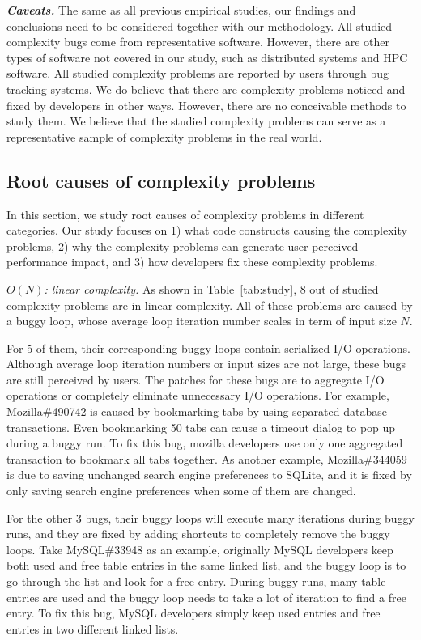 {\bf{\textit{Caveats.}}}
The same as all previous empirical studies, 
our findings and conclusions need to be considered together with our methodology.
All studied complexity bugs come from representative software. 
However, there are other types of software not covered in our study, 
such as distributed systems and HPC software. 
All studied complexity problems are reported by users through bug tracking systems.  
We do believe that there are complexity problems noticed 
and fixed by developers in other ways. 
However, there are no conceivable methods to study them.
We believe that the studied complexity problems can serve as a representative sample
of complexity problems in the real world. 


\subsection{Root causes of complexity problems}



In this section, we study root causes of complexity problems in different categories. 
Our study focuses on 
1) what code constructs causing the complexity problems, 
2) why the complexity problems can generate user-perceived performance impact, 
and 3) how developers fix these complexity problems. 


{\underline{\textit{$O(N)$: linear complexity.}}} 
As shown in Table~\ref{tab:study}, 
8 out of \ComBugs studied complexity problems are in linear complexity. 
All of these problems are caused by a buggy loop, 
whose average loop iteration number scales in term of input size $N$.

For 5 of them, their corresponding buggy loops contain serialized I/O operations.
Although average loop iteration numbers or input sizes are not large,
these bugs are still perceived by users.
The patches for these bugs are to aggregate I/O operations 
or completely eliminate unnecessary I/O operations.   
For example, Mozilla\#490742 is caused by bookmarking tabs 
by using separated database transactions. 
Even bookmarking 50 tabs can cause a timeout dialog to pop up during a buggy run.
To fix this bug, mozilla developers use only one aggregated transaction to bookmark all tabs together.
As another example, Mozilla\#344059 is due to saving unchanged 
search engine preferences to SQLite, 
and it is fixed by only saving search engine preferences when some of them are changed.


For the other 3 bugs, their buggy loops will execute many iterations during buggy runs,
and they are fixed by adding shortcuts to completely remove the buggy loops.
Take MySQL\#33948 as an example, 
originally MySQL developers keep both used and free table entries in the same linked list,
and the buggy loop is to go through the list and look for a free entry.
During buggy runs, many table entries are used and the buggy loop 
needs to take a lot of iteration to find a free entry. 
To fix this bug, MySQL developers simply keep used entries 
and free entries in two different linked lists. 


